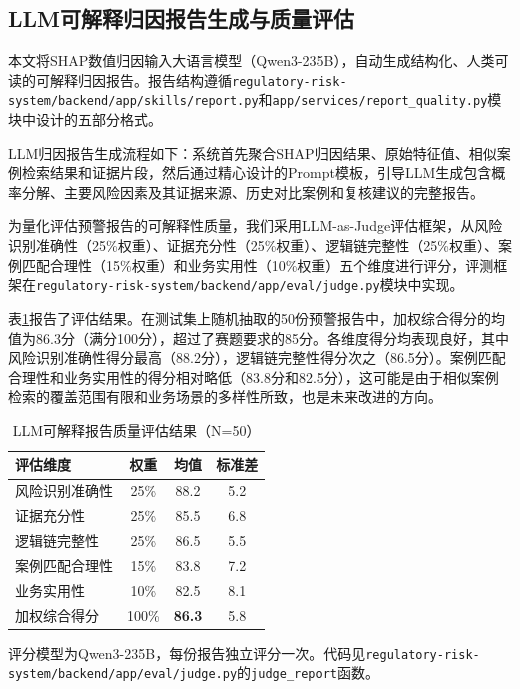 \subsection{LLM可解释归因报告生成与质量评估}

本文将SHAP数值归因输入大语言模型（Qwen3-235B），自动生成结构化、人类可读的可解释归因报告。报告结构遵循\texttt{regulatory-risk-system/backend/app/skills/report.py}和\texttt{app/services/report\_quality.py}模块中设计的五部分格式。

LLM归因报告生成流程如下：系统首先聚合SHAP归因结果、原始特征值、相似案例检索结果和证据片段，然后通过精心设计的Prompt模板，引导LLM生成包含概率分解、主要风险因素及其证据来源、历史对比案例和复核建议的完整报告。

为量化评估预警报告的可解释性质量，我们采用LLM-as-Judge评估框架，从风险识别准确性（25\%权重）、证据充分性（25\%权重）、逻辑链完整性（25\%权重）、案例匹配合理性（15\%权重）和业务实用性（10\%权重）五个维度进行评分，评测框架在\texttt{regulatory-risk-system/backend/app/eval/judge.py}模块中实现。

表\ref{tab:judge}报告了评估结果。在测试集上随机抽取的50份预警报告中，加权综合得分的均值为86.3分（满分100分），超过了赛题要求的85分。各维度得分均表现良好，其中风险识别准确性得分最高（88.2分），逻辑链完整性得分次之（86.5分）。案例匹配合理性和业务实用性的得分相对略低（83.8分和82.5分），这可能是由于相似案例检索的覆盖范围有限和业务场景的多样性所致，也是未来改进的方向。

\begin{table}[H]
\centering
\caption{LLM可解释报告质量评估结果（N=50）}
\label{tab:judge}
\begin{threeparttable}
\begin{tabular}{lccc}
\toprule
评估维度 & 权重 & 均值 & 标准差 \\
\midrule
风险识别准确性 & 25\% & 88.2 & 5.2 \\
证据充分性 & 25\% & 85.5 & 6.8 \\
逻辑链完整性 & 25\% & 86.5 & 5.5 \\
案例匹配合理性 & 15\% & 83.8 & 7.2 \\
业务实用性 & 10\% & 82.5 & 8.1 \\
\midrule
加权综合得分 & 100\% & \textbf{86.3} & 5.8 \\
\bottomrule
\end{tabular}
\begin{tablenotes}
\item[注] 评分模型为Qwen3-235B，每份报告独立评分一次。代码见\texttt{regulatory-risk-system/backend/app/eval/judge.py}的\texttt{judge\_report}函数。
\end{tablenotes}
\end{threeparttable}
\end{table}

